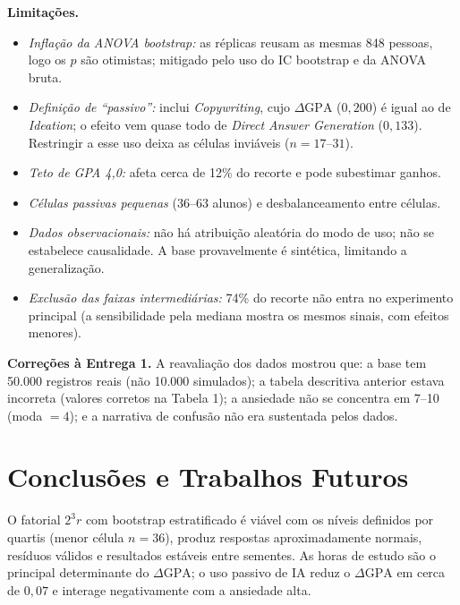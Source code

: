 \documentclass[12pt,a4paper]{article}
\newcommand{\dgpa}{\ensuremath{\Delta\mathrm{GPA}}}
\begin{document}
\textbf{Limita\c{c}\~oes.}
\begin{itemize}
\item \emph{Infla\c{c}\~ao da ANOVA bootstrap:} as r\'eplicas reusam as mesmas 848 pessoas, logo os $p$ s\~ao otimistas; mitigado pelo uso do IC bootstrap e da ANOVA bruta.
\item \emph{Defini\c{c}\~ao de ``passivo'':} inclui \emph{Copywriting}, cujo \dgpa{} ($0{,}200$) \'e igual ao de \emph{Ideation}; o efeito vem quase todo de \emph{Direct Answer Generation} ($0{,}133$). Restringir a esse uso deixa as c\'elulas inviáveis ($n=17$--$31$).
\item \emph{Teto de GPA 4,0:} afeta cerca de 12\% do recorte e pode subestimar ganhos.
\item \emph{C\'elulas passivas pequenas} ($36$--$63$ alunos) e desbalanceamento entre c\'elulas.
\item \emph{Dados observacionais:} n\~ao h\'a atribui\c{c}\~ao aleat\'oria do modo de uso; n\~ao se estabelece causalidade. A base provavelmente \'e sint\'etica, limitando a generaliza\c{c}\~ao.
\item \emph{Exclus\~ao das faixas intermedi\'arias:} 74\% do recorte n\~ao entra no experimento principal (a sensibilidade pela mediana mostra os mesmos sinais, com efeitos menores).
\end{itemize}

\textbf{Corre\c{c}\~oes \`a Entrega 1.} A reavalia\c{c}\~ao dos dados mostrou que: a base tem 50.000 registros reais (n\~ao 10.000 simulados);
a tabela descritiva anterior estava incorreta (valores corretos na Tabela 1); a ansiedade n\~ao se concentra em 7--10 (moda $=4$);
e a narrativa de confus\~ao n\~ao era sustentada pelos dados.

\section{Conclus\~oes e Trabalhos Futuros}
O fatorial $2^3 r$ com bootstrap estratificado \'e vi\'avel com os n\'iveis definidos por quartis (menor c\'elula $n=36$), produz respostas
aproximadamente normais, res\'iduos v\'alidos e resultados est\'aveis entre sementes. As horas de estudo s\~ao o principal determinante do \dgpa{};
o uso passivo de IA reduz o \dgpa{} em cerca de $0{,}07$ e interage negativamente com a ansiedade alta.
\end{document}
